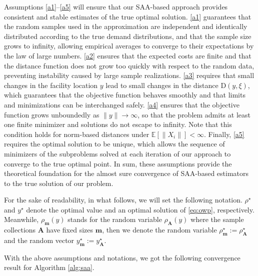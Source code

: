 \documentclass[letter,11pt, reqno]{amsart}
\newcommand{\E}{\mathbb{E}}
\newcommand{\D}{\mathrm{D}}
\renewcommand{\;}{\quad}
\theoremstyle{thmstyleone}%
\theoremstyle{thmstyletwo}%
\theoremstyle{thmstylethree}%
\begin{document}
Assumptions \ref{a1}--\ref{a5} will ensure that our SAA-based approach provides consistent and stable estimates of the true optimal solution. \ref{a1} guarantees that the random samples used in the approximation are independent and identically distributed according to the true demand distributions, and that the sample size grows to infinity, allowing empirical averages to converge to their expectations by the law of large numbers. \ref{a2} ensures that the expected costs are finite and that the distance function does not grow too quickly with respect to the random data, preventing instability caused by large sample realizations. \ref{a3} requires that small changes in the facility location $y$ lead to small changes in the distance $\D(y,\xi)$, which guarantees that the objective function behaves smoothly and that limits and minimizations can be interchanged safely. \ref{a4}  ensures that the objective function grows unboundedly as $\|y\|\to\infty$, so that the problem admits at least one finite minimizer and solutions do not escape to infinity. Note that this condition holds for norm-based distances under $\E\left[\|X_i\|\right]<\infty$. Finally, \ref{a5} requires the optimal solution to be unique, which allows the sequence of minimizers of the subproblems solved at each iteration of our approach to converge to the true optimal point. In sum, these assumptions provide the theoretical foundation for the almost sure convergence of SAA-based estimators to the true solution of our problem.

For the sake of readability, in what follows, we will set the following notation. $\rho^\star$ and $y^\star$ denote the optimal value and an optimal solution of \ref{eq:owp}, respectively. Meanwhile, $\rho_{\mathbf{m}}(y)$ stands for the random variable $\rho_{\mathbf{A}}(y)$ where the sample collections $\mathbf{A}$ have fixed sizes $\mathbf{m}$, then we denote the random variable $\rho^\star_{\mathbf{m}}:=\rho^\star_{\mathbf{A}}$ and the random vector $y^\star_{\mathbf{m}}:=y^\star_{\mathbf{A}}$. 

With the above assumptions and notations, we got the following convergence result for Algorithm \ref{alg:saa}. 
\end{document}
